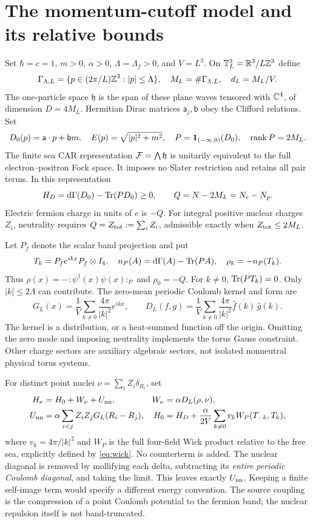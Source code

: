 \section{The momentum-cutoff model and its relative bounds}
\label{sec:model}
Set $\hbar=c=1$, $m>0$, $\alpha>0$, $\Lambda=\Lambda_f>0$, and $V=L^3$.
On $\mathbb T_L^3=\mathbb R^3/L\mathbb Z^3$ define
\[
\Gamma_{\Lambda,L}=\{p\in(2\pi/L)\mathbb Z^3:|p|\le\Lambda\},\quad
M_L=\#\Gamma_{\Lambda,L},\quad d_L=M_L/V.
\]
The one-particle space $\mathfrak h$ is the span of these plane waves
tensored with $\mathbb C^4$, of dimension $D=4M_L$.
Hermitian Dirac matrices $\mathsf a_j,\mathsf b$ obey the Clifford
relations. Set
\[
D_0(p)=\mathsf a\cdot p+\mathsf b m,\quad E(p)=\sqrt{|p|^2+m^2},
\quad P=\mathbf1_{(-\infty,0)}(D_0),\quad \operatorname{rank} P=2M_L.
\]
The finite sea CAR representation $\mathcal F=\bigwedge\mathfrak h$ is
unitarily equivalent to the full electron--positron Fock space.
It imposes no Slater restriction and retains all pair terms.
In this representation
\[
H_D=\mathrm d\Gamma(D_0)-\operatorname{Tr}(PD_0)\ge0,\qquad Q=N-2M_L=N_e-N_p.
\]
Electric fermion charge in units of $e$ is $-Q$.
For integral positive nuclear charges $Z_i$, neutrality requires
$Q=Z_{\rm tot}:=\sum_iZ_i$, admissible exactly when $Z_{\rm tot}\le2M_L$.

Let $P_f$ denote the scalar band projection and put
\[
T_k=P_fe^{ikx}P_f\otimes I_4,\quad
n_P(A)=\mathrm d\Gamma(A)-\operatorname{Tr}(PA),\quad
\rho_k=-n_P(T_k).
\]
Thus $\rho(x)=-:\!\psi^\dagger(x)\psi(x)\!:_P$ and $\rho_0=-Q$.
For $k\ne0$, $\operatorname{Tr}(PT_k)=0$. Only $|k|\le2\Lambda$ can contribute.
The zero-mean periodic Coulomb kernel and form are
\begin{equation}
G_L(x)=\frac1V\sum_{k\ne0}\frac{4\pi}{|k|^2}e^{ikx},\qquad
D_L(f,g)=\frac1V\sum_{k\ne0}\frac{4\pi}{|k|^2}
\overline{\widehat f(k)}\,\widehat g(k).
\label{eq:coulomb}
\end{equation}
The kernel is a distribution, or a heat-summed function off the origin.
Omitting the zero mode and imposing neutrality implements the torus
Gauss constraint. Other charge sectors are auxiliary algebraic sectors,
not isolated nonneutral physical torus systems.

For distinct point nuclei $\nu=\sum_iZ_i\delta_{R_i}$, set
\begin{align}
H_\nu&=H_0+W_\nu+U_{\rm nn},&
W_\nu&=\alpha D_L(\rho,\nu),\\
U_{\rm nn}&=\alpha\sum_{i<j}Z_iZ_jG_L(R_i-R_j),&
H_0&=H_D+\frac{\alpha}{2V}\sum_{k\ne0}v_kW_P(T_{-k},T_k),
\label{eq:model}
\end{align}
where $v_k=4\pi/|k|^2$ and $W_P$ is the full four-field Wick product
relative to the free sea, explicitly defined by \eqref{eq:wick}.
No counterterm is added. The nuclear diagonal is removed by mollifying
each delta, subtracting its \emph{entire periodic Coulomb diagonal},
and taking the limit. This leaves exactly $U_{\rm nn}$.
Keeping a finite self-image term would specify a different energy convention.
The source coupling is the compression of a point Coulomb potential
to the fermion band; the nuclear repulsion itself is not band-truncated.

